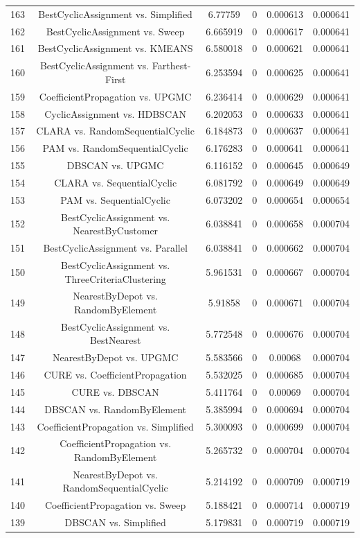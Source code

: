 \documentclass[a4paper,10pt]{article}
\begin{document}
\begin{landscape}
\begin{table}[!htp]
\begin{tabular}{cccccc}
163&BestCyclicAssignment vs. Simplified&6.77759&0&0.000613&0.000641\\
162&BestCyclicAssignment vs. Sweep&6.665919&0&0.000617&0.000641\\
161&BestCyclicAssignment vs. KMEANS&6.580018&0&0.000621&0.000641\\
160&BestCyclicAssignment vs. Farthest-First&6.253594&0&0.000625&0.000641\\
159&CoefficientPropagation vs. UPGMC&6.236414&0&0.000629&0.000641\\
158&CyclicAssignment vs. HDBSCAN&6.202053&0&0.000633&0.000641\\
157&CLARA vs. RandomSequentialCyclic&6.184873&0&0.000637&0.000641\\
156&PAM vs. RandomSequentialCyclic&6.176283&0&0.000641&0.000641\\
155&DBSCAN vs. UPGMC&6.116152&0&0.000645&0.000649\\
154&CLARA vs. SequentialCyclic&6.081792&0&0.000649&0.000649\\
153&PAM vs. SequentialCyclic&6.073202&0&0.000654&0.000654\\
152&BestCyclicAssignment vs. NearestByCustomer&6.038841&0&0.000658&0.000704\\
151&BestCyclicAssignment vs. Parallel&6.038841&0&0.000662&0.000704\\
150&BestCyclicAssignment vs. ThreeCriteriaClustering&5.961531&0&0.000667&0.000704\\
149&NearestByDepot vs. RandomByElement&5.91858&0&0.000671&0.000704\\
148&BestCyclicAssignment vs. BestNearest&5.772548&0&0.000676&0.000704\\
147&NearestByDepot vs. UPGMC&5.583566&0&0.00068&0.000704\\
146&CURE vs. CoefficientPropagation&5.532025&0&0.000685&0.000704\\
145&CURE vs. DBSCAN&5.411764&0&0.00069&0.000704\\
144&DBSCAN vs. RandomByElement&5.385994&0&0.000694&0.000704\\
143&CoefficientPropagation vs. Simplified&5.300093&0&0.000699&0.000704\\
142&CoefficientPropagation vs. RandomByElement&5.265732&0&0.000704&0.000704\\
141&NearestByDepot vs. RandomSequentialCyclic&5.214192&0&0.000709&0.000719\\
140&CoefficientPropagation vs. Sweep&5.188421&0&0.000714&0.000719\\
139&DBSCAN vs. Simplified&5.179831&0&0.000719&0.000719\\

\end{tabular}
\end{table}
\end{landscape}
\end{document}
